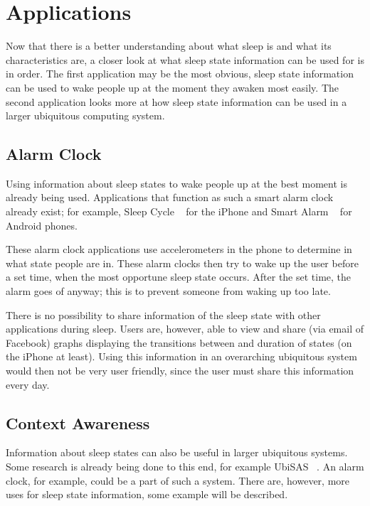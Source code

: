 
\section{Applications} %
\label{sec:applications}
Now that there is a better understanding about what sleep is and what its characteristics are, a closer look at what sleep state information can be used for is in order. The first application may be the most obvious, sleep state information can be used to wake people up at the moment they awaken most easily. The second application looks more at how sleep state information can be used in a larger ubiquitous computing system.

\subsection{Alarm Clock} %
\label{sub:alarm_clock}
Using information about sleep states to wake people up at the best moment is already being used. Applications that function as such a smart alarm clock already exist; for example, Sleep Cycle ~\cite{sleep-cycle} for the iPhone and Smart Alarm ~\cite{smart-alarm-clock} for Android phones.

These alarm clock applications use accelerometers in the phone to determine in what state people are in. These alarm clocks then try to wake up the user before a set time, when the most opportune sleep state occurs. After the set time, the alarm goes of anyway; this is to prevent someone from waking up too late.

There is no possibility to share information of the sleep state with other applications during sleep. Users are, however, able to view and share (via email of Facebook) graphs displaying the transitions between and duration of states (on the iPhone at least). Using this information in an overarching ubiquitous system would then not be very user friendly, since the user must share this information every day.

\subsection{Context Awareness} %
\label{sub:context_awareness}
Information about sleep states can also be useful in larger ubiquitous systems. Some research is already being done to this end, for example UbiSAS ~\cite{Yoon-Sik_Jae-Doo_2006}. An alarm clock, for example, could be a part of such a system. There are, however, more uses for sleep state information, some example will be described.


